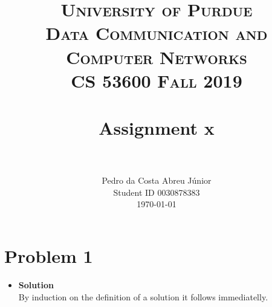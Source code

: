 \documentclass[paper=a4, fontsize=11pt]{scrartcl}
\title{
		\usefont{OT1}{bch}{b}{n}
		\normalfont \normalsize \textsc{University of Purdue\\
      Data Communication and Computer Networks\\
      CS 53600 Fall 2019} \\ [25pt]
		\horrule{0.5pt} \\[0.4cm]
		\huge Assignment x\\
		\horrule{2pt} \\[0.5cm]
}
\author{
		\normalfont\normalsize Pedro da Costa Abreu Júnior\\ [-5pt]
    \normalsize Student ID 0030878383\\[-5pt]
    \normalsize \today
}
\date{}
\numberwithin{equation}{section}		%
\numberwithin{figure}{section}			%
\numberwithin{table}{section}				%
\begin{document}
\maketitle

\section*{Problem 1}

\begin{itemize}
\item \textbf{Solution}\\
  By induction on the definition of a solution it follows immediatelly.
\end{itemize}


\end{document}
